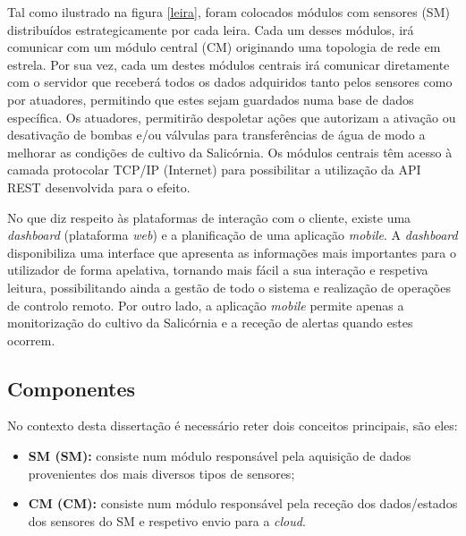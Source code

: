 Tal como ilustrado na figura \ref{leira}, foram colocados módulos com sensores (SM) distribuídos estrategicamente por cada leira. Cada um desses módulos, irá comunicar com um módulo central (CM) originando uma topologia de rede em estrela.  Por sua vez, cada um destes módulos centrais irá comunicar diretamente com o servidor que receberá todos os dados adquiridos tanto pelos sensores como por atuadores, permitindo que estes sejam guardados numa base de dados específica. Os atuadores, permitirão despoletar ações que autorizam a ativação ou desativação de bombas e/ou válvulas para transferências de água de modo a melhorar as condições de cultivo da Salicórnia. 
Os módulos centrais têm acesso à camada protocolar \ac{TCP}/\ac{IP} (Internet) para possibilitar a utilização da \acs{API} \acs{REST} desenvolvida para o efeito. 

No que diz respeito às plataformas de interação com o cliente, existe uma \textit{dashboard} (plataforma \textit{web}) e a planificação de uma aplicação \textit{mobile}. A \textit{dashboard} disponibiliza uma interface que apresenta as informações mais importantes para o utilizador de forma apelativa, tornando mais fácil a sua interação e respetiva leitura, possibilitando ainda a gestão de todo o sistema e realização de operações de controlo remoto. Por outro lado, a aplicação \textit{mobile} permite apenas a monitorização do cultivo da Salicórnia e a receção de alertas quando estes ocorrem.




\subsection{Componentes}

No contexto desta dissertação é necessário reter dois conceitos principais, são eles: 

\begin{itemize}
	\item \textbf{\acl{SM} (SM):} consiste num módulo responsável pela aquisição de dados provenientes dos mais diversos tipos de sensores; 
	
	
	\item \textbf{\acl{CM} (CM):} consiste num módulo responsável pela receção dos dados/estados dos sensores do \acl{SM} e respetivo envio para a \textit{cloud}.  
	
\end{itemize}


